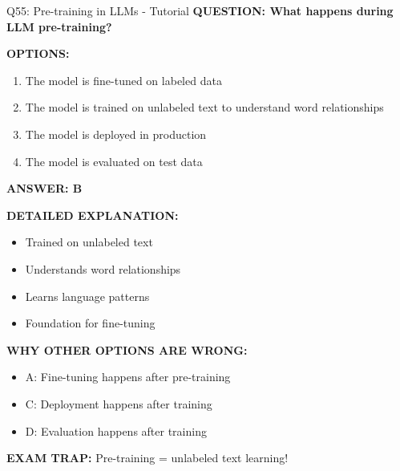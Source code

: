 \documentclass[8pt]{beamer}
\begin{document}
	\begin{frame}{Q55: Pre-training in LLMs - Tutorial}
		\fontsize{6.5}{7.5}\selectfont
		\textbf{QUESTION: What happens during LLM pre-training?}
		
		\vspace{0.1cm}
		\textbf{OPTIONS:}
		\begin{enumerate}
			\item The model is fine-tuned on labeled data
			\item The model is trained on unlabeled text to understand word relationships
			\item The model is deployed in production
			\item The model is evaluated on test data
		\end{enumerate}
		
		\vspace{0.1cm}
		\textcolor{myblue}{\textbf{ANSWER: B}}
		
		\vspace{0.1cm}
		\textbf{DETAILED EXPLANATION:}
		\begin{itemize}
			\item Trained on unlabeled text
			\item Understands word relationships
			\item Learns language patterns
			\item Foundation for fine-tuning
		\end{itemize}
		
		\vspace{0.1cm}
		\textcolor{myred}{\textbf{WHY OTHER OPTIONS ARE WRONG:}}
		\begin{itemize}
			\item \textcolor{myred}{A:} Fine-tuning happens after pre-training
			\item \textcolor{myred}{C:} Deployment happens after training
			\item \textcolor{myred}{D:} Evaluation happens after training
		\end{itemize}
		
		\textcolor{myred}{\textbf{EXAM TRAP:}} Pre-training = \textcolor{myblue}{unlabeled text} learning!
	\end{frame}
	
\end{document}
